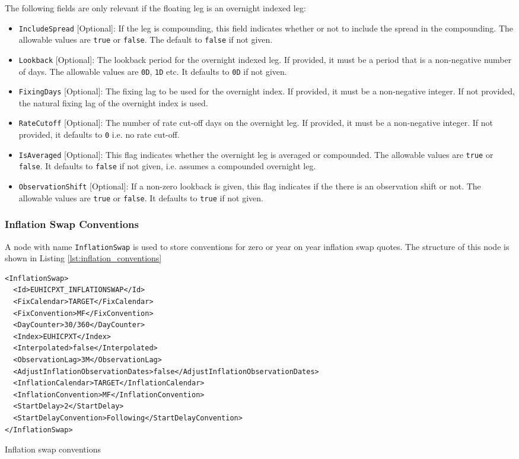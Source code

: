 The following fields are only relevant if the floating leg is an overnight indexed leg:
\begin{itemize}
\item \lstinline!IncludeSpread! [Optional]: If the leg is compounding,
    this field indicates whether or not to include the spread in the compounding.
    The allowable values are \lstinline!true! or \lstinline!false!.
    The default to \lstinline!false! if not given.
\item \lstinline!Lookback! [Optional]: The lookback period for the overnight indexed leg.
    If provided, it must be a period that is a non-negative number of days.
    The allowable values are \lstinline!0D!, \lstinline!1D! etc.
    It defaults to \lstinline!0D! if not given.
\item \lstinline!FixingDays! [Optional]: The fixing lag to be used for the overnight index.
    If provided, it must be a non-negative integer.
    If not provided, the natural fixing lag of the overnight index is used.
\item \lstinline!RateCutoff! [Optional]: The number of rate cut-off days on the overnight leg.
    If provided, it must be a non-negative integer.
    If not provided, it defaults to \lstinline!0! i.e. no rate cut-off.
\item \lstinline!IsAveraged! [Optional]: This flag indicates whether the overnight leg is averaged or compounded.
    The allowable values are \lstinline!true! or \lstinline!false!.
    It defaults to \lstinline!false! if not given, i.e. assumes a compounded overnight leg.
\item \lstinline!ObservationShift! [Optional]: If a non-zero lookback is given,
    this flag indicates if the there is an observation shift or not.
    The allowable values are \lstinline!true! or \lstinline!false!.
    It defaults to \lstinline!true! if not given.
\end{itemize}

\subsubsection{Inflation Swap Conventions}
A node with name \lstinline!InflationSwap! is used to store conventions for zero or year on year inflation swap quotes. The structure of this node is shown in Listing \ref{lst:inflation_conventions}

\begin{listing}[H]
\begin{verbatim}
<InflationSwap>
  <Id>EUHICPXT_INFLATIONSWAP</Id>
  <FixCalendar>TARGET</FixCalendar>
  <FixConvention>MF</FixConvention>
  <DayCounter>30/360</DayCounter>
  <Index>EUHICPXT</Index>
  <Interpolated>false</Interpolated>
  <ObservationLag>3M</ObservationLag>
  <AdjustInflationObservationDates>false</AdjustInflationObservationDates>
  <InflationCalendar>TARGET</InflationCalendar>
  <InflationConvention>MF</InflationConvention>
  <StartDelay>2</StartDelay>
  <StartDelayConvention>Following</StartDelayConvention>
</InflationSwap>
\end{verbatim}
\caption{Inflation swap conventions}
\label{lst:inflation_conventions}
\end{listing}

